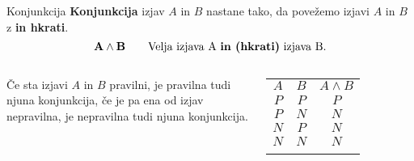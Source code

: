         \begin{frame}
            \begin{alertblock}{Konjunkcija}
                \textbf{Konjunkcija} izjav $A$ in $B$ nastane tako, da povežemo izjavi $A$ in $B$ 
                z \textbf{in hkrati}.
                $$ \mathbf{A\land B} \quad \quad \textmd{Velja izjava A \textbf{in (hkrati)} izjava B.}$$
            \end{alertblock}
            \begin{columns}
                    \begin{alertblock}{}
                        Če sta izjavi $A$ in $B$ pravilni, je pravilna tudi njuna konjunkcija, 
                        če je pa ena od izjav nepravilna, je nepravilna tudi njuna konjunkcija.
                    \end{alertblock}

                    \begin{table}
                        \centering
                        \begin{tabular}{||c|c|c||} 
                        \hhline{|t:===:t|}
                        \rowcolor[rgb]{0.843,0.718,0.718} $A$ & $B$ & $A\land B$  \\ 
                        \hhline{|:===:|}
                        $P$ & $P$ & $P$                         \\ 
                        \hline
                        $P$ & $N$ & $N$                         \\ 
                        \hline
                        $N$ & $P$ & $N$                         \\ 
                        \hline
                        $N$ & $N$ & $N$                         \\
                        \hhline{|b:===:b|}
                        \end{tabular}
                    \end{table}

            \end{columns}


        \end{frame}

